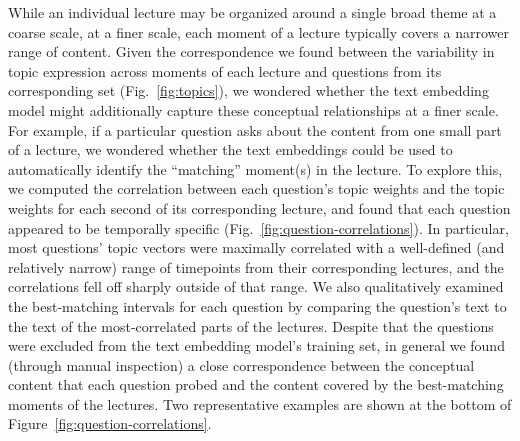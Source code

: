 \documentclass[10pt]{article}
\begin{document}
While an individual lecture may be organized around a single broad theme at a
coarse scale, at a finer scale, each moment of a lecture typically covers a
narrower range of content. Given the correspondence we found between the
variability in topic expression across moments of each lecture and questions
from its corresponding set (Fig.~\ref{fig:topics}), we wondered whether the
text embedding model might additionally capture these conceptual relationships
at a finer scale. For example, if a particular question asks about the content
from one small part of a lecture, we wondered whether the text embeddings could
be used to automatically identify the ``matching'' moment(s) in the lecture. To
explore this, we computed the correlation between each question's topic weights
and the topic weights for each second of its corresponding lecture, and found
that each question appeared to be temporally specific
(Fig.~\ref{fig:question-correlations}). In particular, most questions' topic
vectors were maximally correlated with a well-defined (and relatively narrow)
range of timepoints from their corresponding lectures, and the correlations
fell off sharply outside of that range. We also qualitatively examined the
best-matching intervals for each question by comparing the question's text to
the text of the most-correlated parts of the lectures. Despite that the
questions were excluded from the text embedding model's training set, in
general we found (through manual inspection) a close correspondence between the
conceptual content that each question probed and the content covered by the
best-matching moments of the lectures. Two representative examples are shown at
the bottom of Figure~\ref{fig:question-correlations}.
\end{document}
